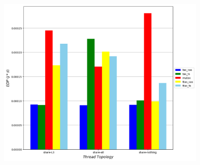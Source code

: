\begin{minipage}{\textwidth}
   \begin{center}
      \\
      \vspace{3mm}
      \includegraphics[width=0.75\textwidth, frame]{./graphs/sniper/threads/topology-edp-analysis.png}
      \vspace{6mm}
   \end{center}
\end{minipage}